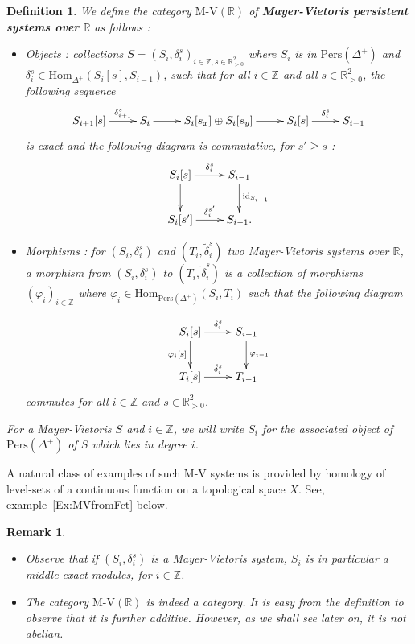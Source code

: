 \documentclass[a4paper, english, 11pt]{article}
\newcommand{\0}{\vec{0}}
\newcommand{\R}[0]{\mathbb{R}}
\newcommand{\Z}[0]{\mathbb{Z}}
\newcommand{\Hom}[0]{\text{Hom}}
\newcommand{\Pers}[0]{\text{Pers}}
\newtheorem{remark}[prop]{Remark}
\newtheorem{defi}[prop]{Definition}
\begin{document}
\begin{defi}\label{D:MVSystem}
We define the category $\text{M-V}(\R)$ of \textbf{Mayer-Vietoris persistent systems over} $\R$ as follows : 

\begin{itemize}
    \item[$\bullet$] Objects : collections $S=(S_i,\delta_i^s)_{i\in \Z,s\in \R_{>0}^2}$ where $S_i$ is in $\text{Pers}(\Delta^+)$ and $\delta_i^s\in \Hom_{\Delta^+}(S_i[s], S_{i-1})$, such that for all $i\in \Z$ and all $s\in \R_{>0}^2$, the following sequence 
    \begin{equation}\xymatrix{S_{i+1}[s] \ar[r]^-{\delta_{i+1}^s} & S_i \ar[r] & S_i[s_x] \oplus S_i[s_y] \ar[r] & S_i[s] \ar[r]^-{\delta_{i}^s} & S_{i-1}}\label{eq:MVSystemles}\end{equation}
    is exact and the following diagram  is commutative, for $s'\geq s$ :  \begin{equation}\label{D:ComSaquareforMV}\xymatrix{  S_i[s] \ar[r]^-{\delta_{i}^{s}} \ar[d] & S_{i-1} \ar[d]^{\text{id}_{S_{i-1}}} \\
    S_i[s'] \ar[r]^-{{\delta}_{i}^{s'}} & S_{i-1}.}\end{equation}
    
    \item[$\bullet$] Morphisms : for $(S_i,\delta_i^s)$ and $(T_i,\tilde{\delta}_i^s)$ two Mayer-Vietoris systems over $\R$, a morphism from $(S_i,\delta_i^s)$ to $(T_i,\tilde{\delta}_i^s)$ is a collection of morphisms $(\varphi_i)_{i\in \Z}$ where $\varphi_i \in \Hom_{\Pers(\Delta^+)}(S_i,T_i)$ such that the following diagram
    
   \begin{equation}\xymatrix{  S_i[s] \ar[r]^-{\delta_{i}^s} \ar[d]_{\varphi_i[s]} & S_{i-1} \ar[d]^{\varphi_{i-1}} \\
    T_i[s] \ar[r]^-{\tilde{\delta}_{i}^s} & T_{i-1}}\end{equation} commutes for all $i\in \Z$ and $s\in \R_{>0}^2$. 
\end{itemize}
For a Mayer-Vietoris $S$ and $i\in \Z$, we will write $S_i$ for the associated object of $\Pers(\Delta^+)$ of $S$ which lies in degree $i$.
\end{defi}
A natural class of examples of such M-V systems is provided by homology of level-sets of a  continuous function on a topological space $X$. See, example~\ref{Ex:MVfromFct} below.
\begin{remark}
\begin{itemize}
    \item Observe that if $(S_i,\delta_i^s)$ is a Mayer-Vietoris system, $S_i$ is in particular a middle exact modules, for $i\in \Z$. 
    \item The category $\text{M-V}(\R)$ is indeed a category. It is easy from the definition to observe that it is further additive. However, as we shall see later on, it is not abelian. 
\end{itemize}
\end{remark}
\end{document}
